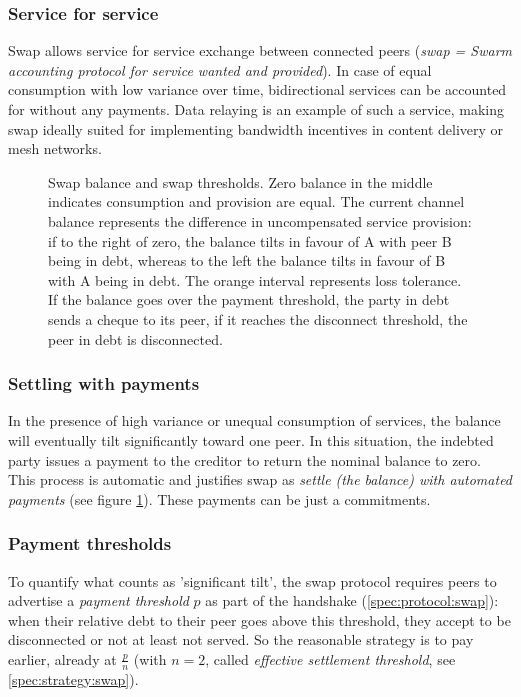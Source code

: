 \subsubsection{Service for service}

Swap allows service for service exchange between connected peers (\emph{swap = Swarm accounting protocol for service wanted and provided}). In case of equal consumption with low variance over time, bidirectional services can be accounted for without any payments. Data relaying is an example of such a service, making swap ideally suited for implementing bandwidth incentives in content delivery or mesh networks.

\begin{center}
\begin{figure}[htbp]

\caption[Swap balance and swap thresholds]{Swap balance and swap thresholds.
Zero balance in the middle indicates consumption and provision are equal.
The current channel balance represents the difference in uncompensated service provision:
if to the right of zero, the balance tilts in favour of A with peer B being in debt, whereas to the left
the balance tilts in favour of B with A being in debt.
The orange interval represents loss tolerance. If the balance goes over the payment threshold, the party in
debt sends a cheque to its peer, if it reaches the disconnect threshold, the peer in debt is disconnected.}
\label{fig:swap}
\end{figure}
\end{center}

\subsubsection{Settling with payments}

In the presence of high variance or unequal consumption of services, the balance will eventually tilt significantly toward one peer. In this situation, the indebted party issues a payment to the creditor to return the nominal balance to zero. This process is automatic and justifies swap as \emph{settle (the balance) with automated payments} (see figure \ref{fig:swap}). These payments can be just a commitments.


\subsubsection{Payment  thresholds}

To quantify what counts as 'significant tilt', the swap protocol requires peers to advertise a \emph{payment threshold} $p$ as part of the handshake (\ref{spec:protocol:swap}): when their relative debt to their peer goes  above this threshold, they accept to be disconnected or not at least not served. So the reasonable  strategy is to pay earlier, already at $\frac{p}{n}$ (with $n=2$, called \emph{effective settlement threshold},  see \ref{spec:strategy:swap}). 


